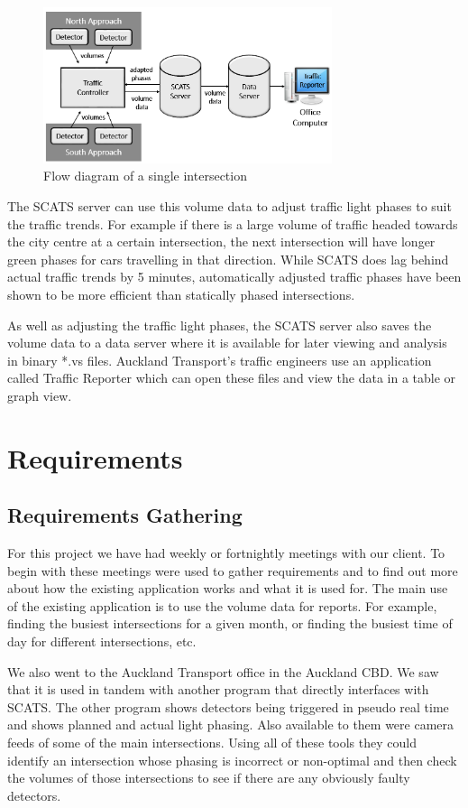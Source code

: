 \documentclass{article}
\begin{document}
\begin{figure}[!t]
\centerline{\includegraphics[height=1.8in]{background}}
\caption{Flow diagram of a single intersection}
\label{fig:background}
\end{figure}

The SCATS server can use this volume data to adjust traffic light phases to suit the traffic trends. For example if there is a large volume of traffic headed towards the city centre at a certain intersection, the next intersection will have longer green phases for cars travelling in that direction. While SCATS does lag behind actual traffic trends by 5 minutes, automatically adjusted traffic phases have been shown to be more efficient than statically phased intersections.

As well as adjusting the traffic light phases, the SCATS server also saves the volume data to a data server where it is available for later viewing and analysis in binary *.vs files. Auckland Transport's traffic engineers use an application called Traffic Reporter which can open these files and view the data in a table or graph view.


\section{Requirements}
\subsection{Requirements Gathering}
For this project we have had weekly or fortnightly
meetings with our client. To begin with these meetings were
used to gather requirements and to find out more about how
the existing application works and what it is used for.
The main use of the existing application is to use the
volume data for reports. For example, finding the busiest
intersections for a given month, or finding the busiest time of
day for different intersections, etc.

We also went to the Auckland Transport office in the
Auckland CBD. We saw that it is used in tandem with another
program that directly interfaces with SCATS. The other
program shows detectors being triggered in pseudo real time
and shows planned and actual light phasing. Also available to
them were camera feeds of some of the main intersections.
Using all of these tools they could identify an intersection
whose phasing is incorrect or non-optimal and then check the
volumes of those intersections to see if there are any obviously
faulty detectors.
\end{document}
